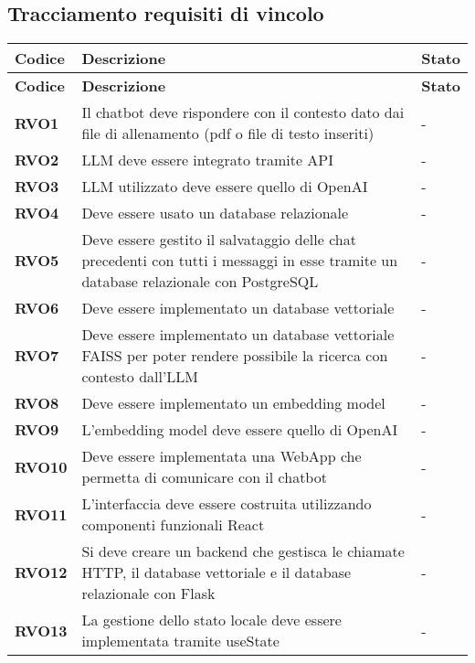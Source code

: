 \subsection{Tracciamento requisiti di vincolo}

\begin{longtable}{|>{\centering\arraybackslash}m{}|>{\centering\arraybackslash}m{}|>{\centering\arraybackslash}m{}|}
	\hline
	\textbf{Codice} & \textbf{Descrizione} & \textbf{Stato}\\\hline
	\endfirsthead
	\hline
	\textbf{Codice} & \textbf{Descrizione} & \textbf{Stato}\\\hline
	\endhead
    \hline
    \textbf{RVO1} & Il chatbot deve rispondere con il contesto dato dai file di allenamento (pdf o file di testo inseriti) & - \\
    \hline
    \textbf{RVO2} & LLM deve essere integrato tramite API & - \\
    \hline
    \textbf{RVO3} & LLM utilizzato deve essere quello di OpenAI & - \\
    \hline
    \textbf{RVO4} & Deve essere usato un database relazionale & - \\
    \hline
    \textbf{RVO5} & Deve essere gestito il salvataggio delle chat precedenti con tutti i messaggi in esse tramite un database relazionale con PostgreSQL & - \\
    \hline
    \textbf{RVO6} & Deve essere implementato un database vettoriale & - \\
    \hline
    \textbf{RVO7} & Deve essere implementato un database vettoriale FAISS per poter rendere possibile la ricerca con contesto dall'LLM & - \\
    \hline
    \textbf{RVO8} & Deve essere implementato un embedding model & - \\
    \hline
    \textbf{RVO9} & L'embedding model deve essere quello di OpenAI & - \\
    \hline
    \textbf{RVO10} & Deve essere implementata una WebApp che permetta di comunicare con il chatbot & - \\
    \hline
    \textbf{RVO11} & L’interfaccia deve essere costruita utilizzando componenti funzionali React & - \\
    \hline
    \textbf{RVO12} & Si deve creare un backend che gestisca le chiamate HTTP, il database vettoriale e il database relazionale con Flask & - \\
    \hline
    \textbf{RVO13} & La gestione dello stato locale deve essere implementata tramite useState & - \\

\end{longtable}
